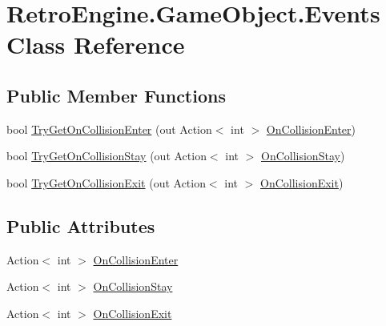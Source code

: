 \hypertarget{class_retro_engine_1_1_game_object_1_1_events}{}\section{Retro\+Engine.\+Game\+Object.\+Events Class Reference}
\label{class_retro_engine_1_1_game_object_1_1_events}
\subsection*{Public Member Functions}
\begin{DoxyCompactItemize}
\item 
bool \mbox{\hyperlink{class_retro_engine_1_1_game_object_1_1_events_ae1e151a935d7084541eef8daa0fb923a}{Try\+Get\+On\+Collision\+Enter}} (out Action$<$ int $>$ \mbox{\hyperlink{class_retro_engine_1_1_game_object_1_1_events_af1d45f114e626dde1371c345e48632f1}{On\+Collision\+Enter}})
\item 
bool \mbox{\hyperlink{class_retro_engine_1_1_game_object_1_1_events_a41f27eeab9bbdc00be01eb6406163129}{Try\+Get\+On\+Collision\+Stay}} (out Action$<$ int $>$ \mbox{\hyperlink{class_retro_engine_1_1_game_object_1_1_events_a22b0a4d5948a5043063bd8002f0580cc}{On\+Collision\+Stay}})
\item 
bool \mbox{\hyperlink{class_retro_engine_1_1_game_object_1_1_events_a8af68d0df61ff9351d2746ef8fb02d7d}{Try\+Get\+On\+Collision\+Exit}} (out Action$<$ int $>$ \mbox{\hyperlink{class_retro_engine_1_1_game_object_1_1_events_a121de358e55868eb50260e09d65eac52}{On\+Collision\+Exit}})
\end{DoxyCompactItemize}
\subsection*{Public Attributes}
\begin{DoxyCompactItemize}
\item 
Action$<$ int $>$ \mbox{\hyperlink{class_retro_engine_1_1_game_object_1_1_events_af1d45f114e626dde1371c345e48632f1}{On\+Collision\+Enter}}
\item 
Action$<$ int $>$ \mbox{\hyperlink{class_retro_engine_1_1_game_object_1_1_events_a22b0a4d5948a5043063bd8002f0580cc}{On\+Collision\+Stay}}
\item 
Action$<$ int $>$ \mbox{\hyperlink{class_retro_engine_1_1_game_object_1_1_events_a121de358e55868eb50260e09d65eac52}{On\+Collision\+Exit}}
\end{DoxyCompactItemize}


